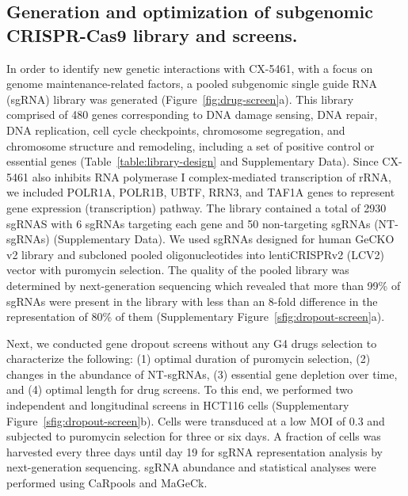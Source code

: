 
\subsection{Generation and optimization of subgenomic CRISPR-Cas9 library and screens.}
In order to identify new genetic interactions with CX-5461, with a focus on genome maintenance-related factors, a pooled subgenomic single guide RNA (sgRNA) library was generated (Figure~\ref{fig:drug-screen}a). 
This library comprised of 480 genes corresponding to DNA damage sensing, DNA repair, DNA replication, cell cycle checkpoints, chromosome segregation, and chromosome structure and remodeling, including a set of positive control or essential genes (Table~\ref{table:library-design} and Supplementary Data)\cite{Croft2014,Fabregat2016,Espeseth2011,Kanehisa2000}. 
Since CX-5461 also inhibits RNA polymerase I complex-mediated transcription of rRNA, we included POLR1A, POLR1B, UBTF, RRN3, and TAF1A genes to represent gene expression (transcription) pathway. 
The library contained a total of 2930 sgRNAS with 6 sgRNAs targeting each gene and 50 non-targeting sgRNAs (NT-sgRNAs)  (Supplementary Data). 
We used sgRNAs designed for human GeCKO v2 library and subcloned pooled oligonucleotides into lentiCRISPRv2 (LCV2) vector with puromycin selection\cite{Sanjana2014}. 
The quality of the pooled library was determined by next-generation sequencing which revealed that more than 99\% of sgRNAs were present in the library with less than an 8-fold difference in the representation of 80\% of them (Supplementary Figure~\ref{sfig:dropout-screen}a). 

Next, we conducted gene dropout screens without any G4 drugs selection to characterize the following: (1) optimal duration of puromycin selection, (2) changes in the abundance of NT-sgRNAs, (3) essential gene depletion over time, and (4) optimal length for drug screens. 
To this end, we performed two independent and longitudinal screens in HCT116 cells (Supplementary Figure~\ref{sfig:dropout-screen}b). 
Cells were transduced at a low MOI of 0.3 and subjected to puromycin selection for three or six days. 
A fraction of cells was harvested every three days until day 19 for sgRNA representation analysis by next-generation sequencing. 
sgRNA abundance and statistical analyses were performed using CaRpools and MaGeCk\cite{Winter2016,Li2014}.


